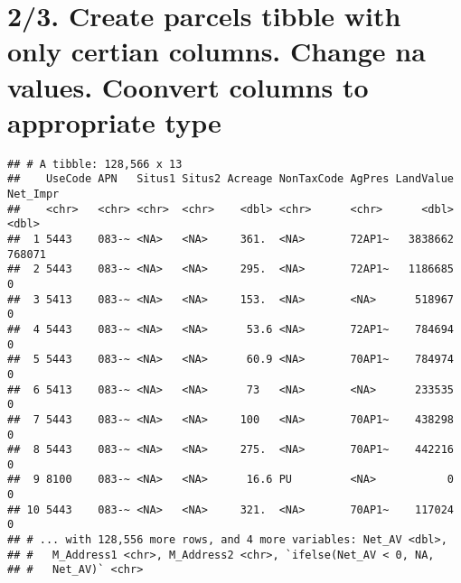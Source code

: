 \documentclass[]{article}
\newenvironment{Shaded}{\begin{snugshade}}{\end{snugshade}}
\newcommand{\KeywordTok}[1]{\textcolor[rgb]{0.13,0.29,0.53}{\textbf{#1}}}
\newcommand{\DecValTok}[1]{\textcolor[rgb]{0.00,0.00,0.81}{#1}}
\newcommand{\StringTok}[1]{\textcolor[rgb]{0.31,0.60,0.02}{#1}}
\newcommand{\CommentTok}[1]{\textcolor[rgb]{0.56,0.35,0.01}{\textit{#1}}}
\newcommand{\OtherTok}[1]{\textcolor[rgb]{0.56,0.35,0.01}{#1}}
\newcommand{\OperatorTok}[1]{\textcolor[rgb]{0.81,0.36,0.00}{\textbf{#1}}}
\newcommand{\NormalTok}[1]{#1}
\begin{document}
\section{2/3. Create parcels tibble with only certian columns. Change na
values. Coonvert columns to appropriate
type}\label{create-parcels-tibble-with-only-certian-columns.-change-na-values.-coonvert-columns-to-appropriate-type}

\begin{Shaded}
\end{Shaded}

\begin{verbatim}
## # A tibble: 128,566 x 13
##    UseCode APN   Situs1 Situs2 Acreage NonTaxCode AgPres LandValue Net_Impr
##    <chr>   <chr> <chr>  <chr>    <dbl> <chr>      <chr>      <dbl>    <dbl>
##  1 5443    083-~ <NA>   <NA>     361.  <NA>       72AP1~   3838662   768071
##  2 5443    083-~ <NA>   <NA>     295.  <NA>       72AP1~   1186685        0
##  3 5413    083-~ <NA>   <NA>     153.  <NA>       <NA>      518967        0
##  4 5443    083-~ <NA>   <NA>      53.6 <NA>       72AP1~    784694        0
##  5 5443    083-~ <NA>   <NA>      60.9 <NA>       70AP1~    784974        0
##  6 5413    083-~ <NA>   <NA>      73   <NA>       <NA>      233535        0
##  7 5443    083-~ <NA>   <NA>     100   <NA>       70AP1~    438298        0
##  8 5443    083-~ <NA>   <NA>     275.  <NA>       70AP1~    442216        0
##  9 8100    083-~ <NA>   <NA>      16.6 PU         <NA>           0        0
## 10 5443    083-~ <NA>   <NA>     321.  <NA>       70AP1~    117024        0
## # ... with 128,556 more rows, and 4 more variables: Net_AV <dbl>,
## #   M_Address1 <chr>, M_Address2 <chr>, `ifelse(Net_AV < 0, NA,
## #   Net_AV)` <chr>
\end{verbatim}
\end{document}
